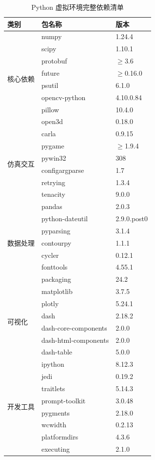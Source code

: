 \begin{table}[htbp]
	\centering
	\caption{Python 虚拟环境完整依赖清单}
	\label{tab:full-dependencies}
	\begin{tabular}{lll}
		\hline
		\textbf{类别} & \textbf{包名称} & \textbf{版本} \\ 
		\hline
		\multirow{8}{*}{核心依赖}
		& numpy & 1.24.4 \\
		& scipy & 1.10.1 \\
		& protobuf & $\geq$3.6 \\
		& future & $\geq$0.16.0 \\
		& psutil & 6.1.0 \\
		& opencv-python & 4.10.0.84 \\
		& pillow & 10.4.0 \\
		& open3d & 0.18.0 \\
		
		\hline
		\multirow{6}{*}{仿真交互}
		& carla & 0.9.15 \\
		& pygame & $\geq$1.9.4 \\
		& pywin32 & 308 \\
		& configargparse & 1.7 \\
		& retrying & 1.3.4 \\
		& tenacity & 9.0.0 \\
		
		\hline
		\multirow{7}{*}{数据处理}
		& pandas & 2.0.3 \\
		& python-dateutil & 2.9.0.post0 \\
		& pyparsing & 3.1.4 \\
		& contourpy & 1.1.1 \\
		& cycler & 0.12.1 \\
		& fonttools & 4.55.1 \\
		& packaging & 24.2 \\
		
		\hline
		\multirow{6}{*}{可视化}
		& matplotlib & 3.7.5 \\
		& plotly & 5.24.1 \\
		& dash & 2.18.2 \\
		& dash-core-components & 2.0.0 \\
		& dash-html-components & 2.0.0 \\
		& dash-table & 5.0.0 \\
		
		\hline
		\multirow{8}{*}{开发工具}
		& ipython & 8.12.3 \\
		& jedi & 0.19.2 \\
		& traitlets & 5.14.3 \\
		& prompt-toolkit & 3.0.48 \\
		& pygments & 2.18.0 \\
		& wcwidth & 0.2.13 \\
		& platformdirs & 4.3.6 \\
		& executing & 2.1.0 \\
		

\end{tabular}
\end{table}
